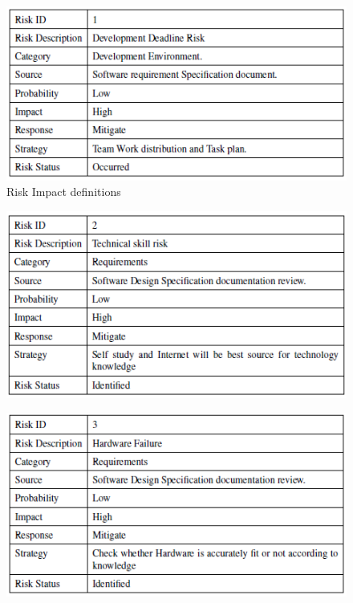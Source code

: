 \begin{figure}[h!]
	\centering
	\includegraphics[width=.95\linewidth]{./r3}
		\caption{Risk Impact definitions}
		\label{fig:Risk Impact definitions}	
		
	\end{figure}
\begin{figure}[h!]
	\centering
	\includegraphics[width=.95\linewidth]{./r4}	
	\end{figure}
\newpage
\begin{figure}[h!]
	\centering
	\includegraphics[width=.95\linewidth]{./r5}
			
		
	\end{figure}
